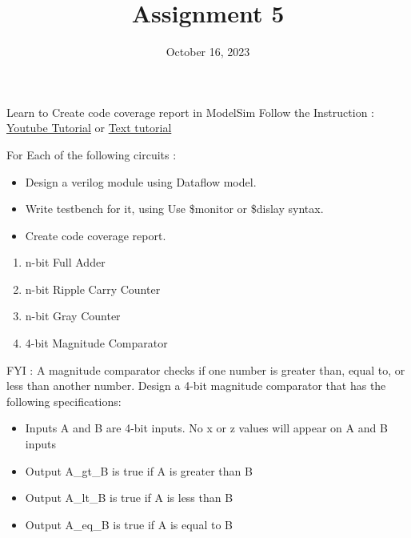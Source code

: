 \documentclass{vhdl-assignment}
\title{Assignment 5}
\date{October 16, 2023}
\begin{document}
\maketitle
\thispagestyle{fancy}

\begin{problem}{Learn to Create code coverage report in ModelSim}
    Follow the Instruction : \href{https://youtu.be/vkzd5ckQ5ZQ}{Youtube Tutorial}
    or
    \href{https://github.com/canh25xp/VHDL_Weekly_Assignment/wiki/Code-Coverage-Report-Tutorial}{Text tutorial}

\end{problem}

\begin{problem}{}
    For Each of the following circuits :
    \begin{itemize}
        \item Design a verilog module using Dataflow model.
        \item Write testbench for it, using Use \$monitor or \$dislay syntax.
        \item Create code coverage report.
    \end{itemize}

    \begin{enumerate}
        \item n-bit Full Adder
        \item n-bit Ripple Carry Counter
        \item n-bit Gray Counter
        \item 4-bit Magnitude Comparator
    \end{enumerate}

FYI : A magnitude comparator checks if one number is greater than, equal to, or less than
another number. Design a 4-bit magnitude comparator that has the following
specifications:

\begin{itemize}
    \item Inputs A and B are 4-bit inputs. No x or z values will appear on A and B inputs
    \item Output A\_gt\_B is true if A is greater than B
    \item Output A\_lt\_B is true if A is less than B
    \item Output A\_eq\_B is true if A is equal to B
\end{itemize}

\end{problem}
\end{document}
